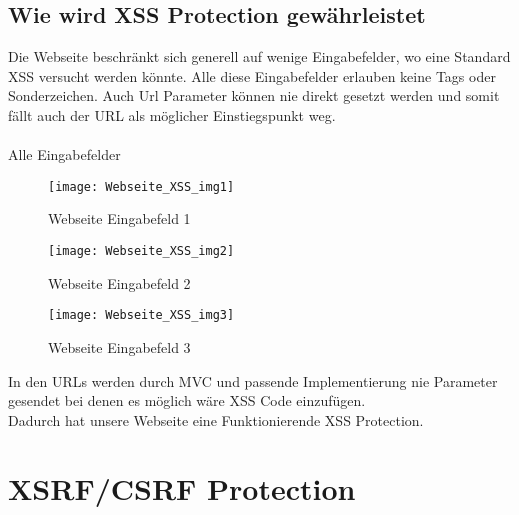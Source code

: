 {\subsection{Wie wird XSS Protection gewährleistet}
\label{sec:xss_prot}
Die Webseite beschränkt sich generell auf wenige Eingabefelder, wo eine Standard XSS versucht werden könnte. Alle diese Eingabefelder erlauben keine Tags oder Sonderzeichen. Auch Url Parameter können nie direkt gesetzt werden und somit fällt auch der URL als möglicher Einstiegspunkt weg.\\ \\Alle Eingabefelder
\begin{figure}[H]
    \texttt{[image: Webseite\_XSS\_img1]}
    \caption{Webseite Eingabefeld 1}
    \label{fig:webxxs1}
\end{figure}
\begin{figure}[H]
    \texttt{[image: Webseite\_XSS\_img2]}
    \caption{Webseite Eingabefeld 2}
    \label{fig:webxxs1}
\end{figure}
\begin{figure}[H]
    \texttt{[image: Webseite\_XSS\_img3]}
    \caption{Webseite Eingabefeld 3}
    \label{fig:webxxs1}
\end{figure}
In den URLs werden durch MVC und passende Implementierung nie Parameter gesendet bei denen es möglich wäre XSS Code einzufügen.\\
Dadurch hat unsere Webseite eine Funktionierende XSS Protection.
\section{XSRF/CSRF Protection}
\label{sec:csrf}
}
